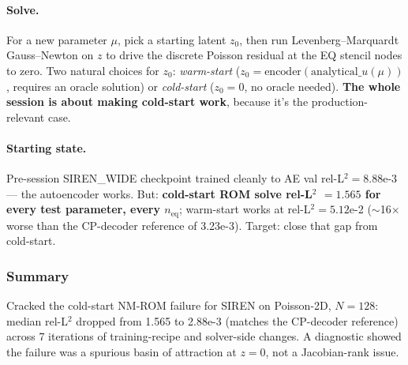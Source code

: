 \paragraph{Solve.} For a new parameter $\mu$, pick a starting latent
$z_0$, then run Levenberg--Marquardt Gauss--Newton on $z$ to drive the
discrete Poisson residual at the EQ stencil nodes to zero. Two natural
choices for $z_0$: \emph{warm-start} ($z_0 = \text{encoder}(\text{
analytical}\_u(\mu))$, requires an oracle solution) or \emph{cold-start}
($z_0 = 0$, no oracle needed). \textbf{The whole session is about making
cold-start work}, because it's the production-relevant case.

\paragraph{Starting state.} Pre-session SIREN\_WIDE checkpoint trained
cleanly to AE val rel-L$^2 = 8.88$e-3 --- the autoencoder works. But:
\textbf{cold-start ROM solve rel-L$^2$ $= 1.565$ for every test
parameter, every $n_{\text{eq}}$}; warm-start works at rel-L$^2 =
5.12$e-2 ($\sim$16$\times$ worse than the CP-decoder reference of
3.23e-3). Target: close that gap from cold-start.

\subsubsection*{Summary}
Cracked the cold-start NM-ROM failure for SIREN on Poisson-2D, $N{=}128$:
median rel-L$^2$ dropped from 1.565 to 2.88e-3 (matches the CP-decoder
reference) across 7 iterations of training-recipe and solver-side changes.
A diagnostic showed the failure was a spurious basin of attraction at
$z{=}0$, not a Jacobian-rank issue.

